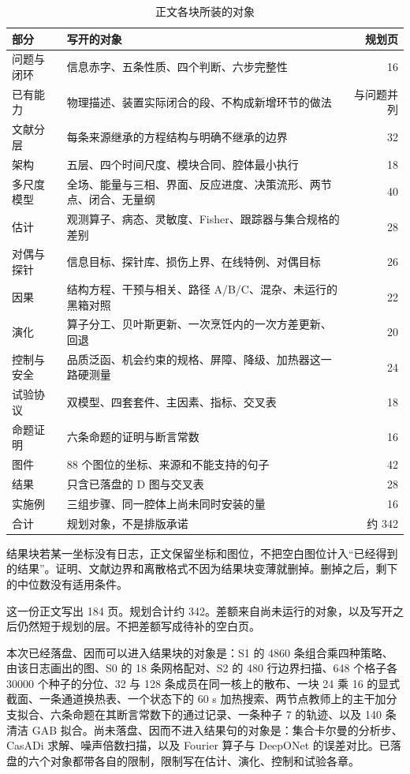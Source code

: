 \begin{table}[ht]
\centering
\caption{正文各块所装的对象}
\begin{tabularx}{\textwidth}{lXr}
\toprule
部分 & 写开的对象 & 规划页 \\
\midrule
问题与闭环 & 信息赤字、五条性质、四个判断、六步完整性 & 16 \\
已有能力 & 物理描述、装置实际闭合的段、不构成新增环节的做法 & 与问题并列 \\
文献分层 & 每条来源继承的方程结构与明确不继承的边界 & 32 \\
架构 & 五层、四个时间尺度、模块合同、腔体最小执行 & 18 \\
多尺度模型 & 全场、能量与三相、界面、反应进度、决策流形、两节点、闭合、无量纲 & 40 \\
估计 & 观测算子、病态、灵敏度、Fisher、跟踪器与集合规格的差别 & 28 \\
对偶与探针 & 信息目标、探针库、损伤上界、在线特例、对偶目标 & 26 \\
因果 & 结构方程、干预与相关、路径 A/B/C、混杂、未运行的黑箱对照 & 22 \\
演化 & 算子分工、贝叶斯更新、一次烹饪内的一次方差更新、回退 & 20 \\
控制与安全 & 品质泛函、机会约束的规格、屏障、降级、加热器这一路硬测量 & 24 \\
试验协议 & 双模型、四套套件、主因素、指标、交叉表 & 18 \\
命题证明 & 六条命题的证明与断言常数 & 16 \\
图件 & 88 个图位的坐标、来源和不能支持的句子 & 42 \\
结果 & 只含已落盘的 D 图与交叉表 & 28 \\
实施例 & 三组步骤、同一腔体上尚未同时安装的量 & 16 \\
\midrule
合计 & 规划对象，不是排版承诺 & 约 342 \\
\bottomrule
\end{tabularx}
\end{table}

结果块若某一坐标没有日志，正文保留坐标和图位，不把空白图位计入“已经得到的结果”。证明、文献边界和离散格式不因为结果块变薄就删掉。删掉之后，剩下的中位数没有适用条件。

这一份正文写出 184 页。规划合计约 342。差额来自尚未运行的对象，以及写开之后仍然短于规划的层。不把差额写成待补的空白页。

本次已经落盘、因而可以进入结果块的对象是：S1 的 4860 条组合乘四种策略、由该日志画出的图、S0 的 18 条网格配对、S2 的 480 行边界扫描、648 个格子各 30000 个种子的分位、32 与 128 条成员在同一核上的散布、一块 24 乘 16 的显式截面、一条通道换热表、一个状态下的 60 s 加热搜索、两节点教师上的主干加分支拟合、六条命题在其断言常数下的通过记录、一条种子 7 的轨迹、以及 140 条清洁 GAB 拟合。尚未落盘、因而不进入结果句的对象是：集合卡尔曼的分析步、CasADi 求解、噪声倍数扫描，以及 Fourier 算子与 DeepONet 的误差对比。已落盘的六个对象都带各自的限制，限制写在估计、演化、控制和试验各章。

